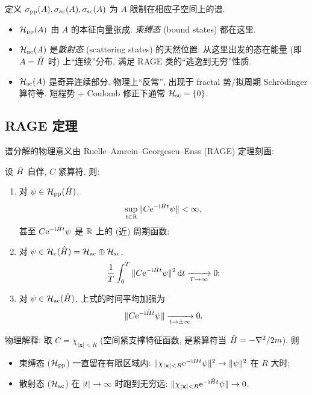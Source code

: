 定义 $\sigma_{\rm pp}(A), \sigma_{\rm ac}(A), \sigma_{\rm sc}(A)$ 为 $A$ 限制在相应子空间上的谱.

\begin{itemize}
    \item $\mathcal{H}_{\rm pp}(A)$ 由 $A$ 的本征向量张成. \emph{束缚态} (bound states) 都在这里.
    \item $\mathcal{H}_{\rm ac}(A)$ 是\emph{散射态} (scattering states) 的天然位置: 从这里出发的态在能量 (即 $A=\hat{H}$ 时) 上``连续''分布, 满足 RAGE 类的``逃逸到无穷''性质.
    \item $\mathcal{H}_{\rm sc}(A)$ 是奇异连续部分. 物理上``反常'', 出现于 fractal 势/拟周期 Schrödinger 算符等. 短程势 + Coulomb 修正下通常 $\mathcal{H}_{\rm sc}=\{0\}$.
\end{itemize}

\subsection{RAGE 定理}

谱分解的物理意义由 Ruelle--Amrein--Georgescu--Enss (RAGE) 定理刻画:

\begin{theorem}\label{thm:hilbert-rage}
设 $\hat{H}$ 自伴, $C$ 紧算符. 则:
\begin{enumerate}
    \item 对 $\psi\in\mathcal{H}_{\rm pp}(\hat{H})$,
    \begin{equation}\label{eq:hilbert-rage-pp}
    \sup_{t\in\mathbb{R}}\|C\mathrm{e}^{-\mathrm{i}\hat{H}t}\psi\|<\infty,
    \end{equation}
    甚至 $C\mathrm{e}^{-\mathrm{i}\hat{H}t}\psi$ 是 $\mathbb{R}$ 上的 (近) 周期函数;
    \item 对 $\psi\in\mathcal{H}_{\rm c}(\hat{H})=\mathcal{H}_{\rm ac}\oplus\mathcal{H}_{\rm sc}$,
    \begin{equation}\label{eq:hilbert-rage-c}
    \frac{1}{T}\int_0^T \|C\mathrm{e}^{-\mathrm{i}\hat{H}t}\psi\|^2\,\mathrm{d} t \xrightarrow[T\to\infty]{} 0;
    \end{equation}
    \item 对 $\psi\in\mathcal{H}_{\rm ac}(\hat{H})$, 上式的时间平均加强为
    \begin{equation}\label{eq:hilbert-rage-ac}
    \|C\mathrm{e}^{-\mathrm{i}\hat{H}t}\psi\|\xrightarrow[t\to\pm\infty]{}0.
    \end{equation}
\end{enumerate}
\end{theorem}

物理解释: 取 $C=\chi_{|\mathbf{x}|<R}$ (空间紧支撑特征函数, 是紧算符当 $\hat{H}=-\nabla^2/2m$). 则
\begin{itemize}
    \item 束缚态 ($\mathcal{H}_{\rm pp}$) 一直留在有限区域内: $\|\chi_{|\mathbf{x}|<R}\mathrm{e}^{-\mathrm{i}\hat{H}t}\psi\|^2\to\|\psi\|^2$ 在 $R$ 大时;
    \item 散射态 ($\mathcal{H}_{\rm ac}$) 在 $|t|\to\infty$ 时跑到无穷远: $\|\chi_{|\mathbf{x}|<R}\mathrm{e}^{-\mathrm{i}\hat{H}t}\psi\|\to 0$.
\end{itemize}

